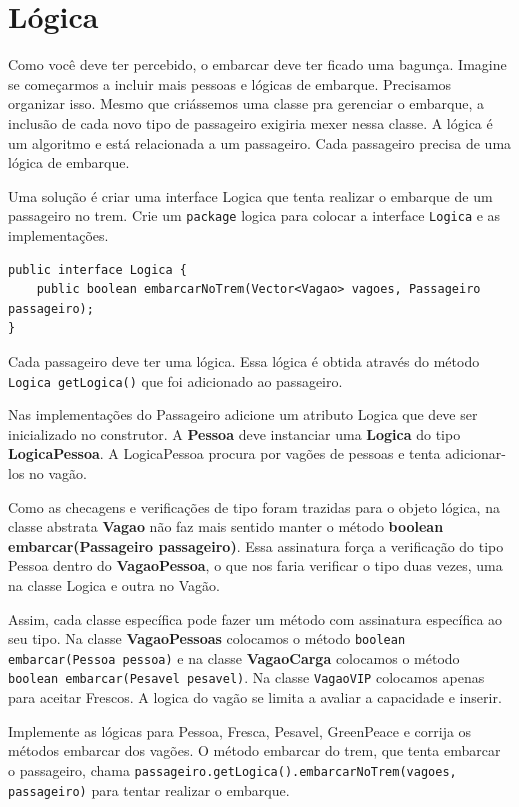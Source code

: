 \documentclass[12pt]{article}
\renewcommand{\tt}[1]{\lstinline|#1|}
\renewcommand{\bf}[1]{\textbf{#1}}
\begin{document}
{\section{Lógica}
Como você deve ter percebido, o embarcar deve ter ficado uma bagunça. Imagine se começarmos a incluir mais pessoas
e lógicas de embarque. Precisamos organizar isso. Mesmo que criássemos uma classe pra gerenciar o embarque, 
a inclusão de cada novo tipo de passageiro exigiria mexer nessa classe. A lógica é um algoritmo e está relacionada
a um passageiro. Cada passageiro precisa de uma lógica de embarque.

Uma solução é criar uma interface Logica que tenta realizar o embarque de um passageiro no trem.
Crie um \tt{package} logica para colocar a interface \tt{Logica} e as implementações.

\begin{lstlisting}[float=ht]
public interface Logica {
    public boolean embarcarNoTrem(Vector<Vagao> vagoes, Passageiro passageiro);
}
\end{lstlisting}

Cada passageiro deve ter uma lógica. Essa lógica é obtida através do método \tt{Logica getLogica()} que foi adicionado
ao passageiro. 

Nas implementações do Passageiro adicione um atributo Logica que deve ser inicializado no construtor. A \bf{Pessoa} deve instanciar uma \bf{Logica} do tipo \bf{LogicaPessoa}. A LogicaPessoa procura por vagões de pessoas e tenta adicionar-los no vagão. 

Como as checagens e verificações de tipo foram trazidas para o objeto lógica, na classe abstrata \bf{Vagao} não 
faz mais sentido manter o método \bf{boolean embarcar(Passageiro passageiro)}. Essa assinatura força a verificação do tipo Pessoa dentro do \bf{VagaoPessoa}, o que nos faria verificar o tipo duas vezes, uma na classe Logica e outra no Vagão. 

Assim, cada classe específica pode fazer um método com assinatura específica ao seu tipo. Na classe \bf{VagaoPessoas} colocamos o método \tt{boolean embarcar(Pessoa pessoa)} e na classe \bf{VagaoCarga} colocamos o método \tt{boolean embarcar(Pesavel pesavel)}.
Na classe \tt{VagaoVIP} colocamos apenas para aceitar Frescos. A logica do vagão se limita a avaliar a capacidade e inserir.

Implemente as lógicas para Pessoa, Fresca, Pesavel, GreenPeace e corrija os métodos embarcar dos vagões. O método embarcar
do trem, que tenta embarcar o passageiro, chama 
\tt{passageiro.getLogica().embarcarNoTrem(vagoes, passageiro)} para tentar realizar o embarque.

}
\end{document}
